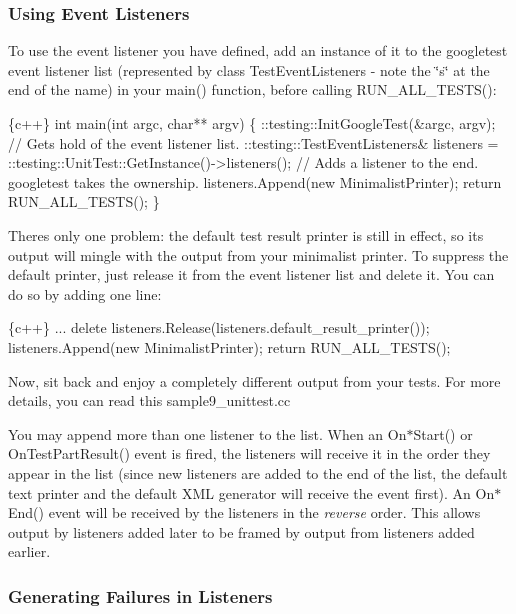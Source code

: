 \subsubsection*{Using Event Listeners}

To use the event listener you have defined, add an instance of it to the googletest event listener list (represented by class Test\+Event\+Listeners -\/ note the \char`\"{}s\char`\"{} at the end of the name) in your {\ttfamily main()} function, before calling {\ttfamily R\+U\+N\+\_\+\+A\+L\+L\+\_\+\+T\+E\+S\+T\+S()}\+:


\begin{DoxyCode}
\{c++\}
int main(int argc, char** argv) \{
  ::testing::InitGoogleTest(&argc, argv);
  // Gets hold of the event listener list.
  ::testing::TestEventListeners& listeners =
        ::testing::UnitTest::GetInstance()->listeners();
  // Adds a listener to the end.  googletest takes the ownership.
  listeners.Append(new MinimalistPrinter);
  return RUN\_ALL\_TESTS();
\}
\end{DoxyCode}


There\textquotesingle{}s only one problem\+: the default test result printer is still in effect, so its output will mingle with the output from your minimalist printer. To suppress the default printer, just release it from the event listener list and delete it. You can do so by adding one line\+:


\begin{DoxyCode}
\{c++\}
  ...
  delete listeners.Release(listeners.default\_result\_printer());
  listeners.Append(new MinimalistPrinter);
  return RUN\_ALL\_TESTS();
\end{DoxyCode}


Now, sit back and enjoy a completely different output from your tests. For more details, you can read this sample9\+\_\+unittest.\+cc

You may append more than one listener to the list. When an {\ttfamily On$\ast$\+Start()} or {\ttfamily On\+Test\+Part\+Result()} event is fired, the listeners will receive it in the order they appear in the list (since new listeners are added to the end of the list, the default text printer and the default X\+ML generator will receive the event first). An {\ttfamily On$\ast$\+End()} event will be received by the listeners in the {\itshape reverse} order. This allows output by listeners added later to be framed by output from listeners added earlier.

\subsubsection*{Generating Failures in Listeners}

